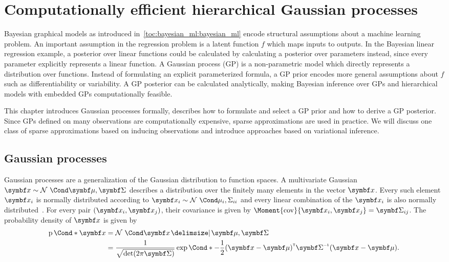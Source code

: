 \chapter{Computationally efficient hierarchical Gaussian processes}
\label{toc:gp}
Bayesian graphical models as introduced in~\cref{toc:bayesian_ml:bayesian_ml} encode structural assumptions about a machine learning problem.
An important assumption in the regression problem is a latent function $f$ which maps inputs to outputs.
In the Bayesian linear regression example, a posterior over linear functions could be calculated by calculating a posterior over parameters instead, since every parameter explicitly represents a linear function.
A Gaussian process (GP) is a non-parametric model which directly represents a distribution over functions.
Instead of formulating an explicit parameterized formula, a GP prior encodes more general assumptions about $f$ such as differentiability or variability.
A GP posterior can be calculated analytically, making Bayesian inference over GPs and hierarchical models with embedded GPs computationally feasible.

This chapter introduces Gaussian processes formally, describes how to formulate and select a GP prior and how to derive a GP posterior.
Since GPs defined on many observations are computationally expensive, sparse approximations are used in practice.
We will discuss one class of sparse approximations based on inducing observations and introduce approaches based on variational inference.

\section{Gaussian processes}
Gaussian processes are a generalization of the Gaussian distribution to function spaces.
A multivariate Gaussian $\mat{x} \sim \Gaussian{\mat{\mu}, \mat{\Sigma}}$ describes a distribution over the finitely many elements in the vector $\mat{x}$.
Every such element $\rv{x}_i$ is normally distributed according to $\rv{x}_i \sim \Gaussian{\mu_i, \Sigma_{ii}}$ and every linear combination of the $\mat{x}_i$ is also normally distributed~\parencite{astrom_introduction_1971}.
For every pair $(\rv{x}_i, \rv{x}_j)$, their covariance is given by $\Moment{\cov}{\rv{x}_i, \rv{x}_j} = \mat{\Sigma}_{ij}$.
The probability density of $\mat{x}$ is given by
\begin{align}
    \begin{split}
        \label{eq:gaussian_pdf}
        \Prob*{\mat{x}}
        &= \Gaussian{\mat{x} \given \mat{\mu}, \mat{\Sigma}} \\
        &= \frac{1}{\sqrt{\det(2\pi\mat{\Sigma})}}\Fun*{\exp}{-\frac{1}{2}(\mat{x} - \mat{\mu})\tran \mat{\Sigma}\inv (\mat{x} - \mat{\mu})}.
    \end{split}
\end{align}

